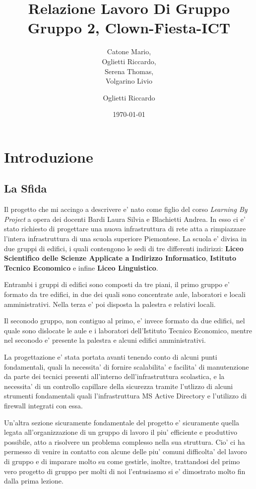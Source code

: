 \documentclass{report}
\author{Catone Mario,\\
	Oglietti Riccardo,\\
	Serena Thomas,\\
Volgarino Livio}
\title{Relazione Lavoro Di Gruppo\\
\large Gruppo 2, Clown-Fiesta-ICT}
\date{\today}
\begin{document}
	\maketitle
	\tableofcontents
	\chapter{Introduzione}
	\author{Oglietti Riccardo}
		\section{La Sfida}
			Il progetto che mi accingo a descrivere e' nato come figlio del corso \emph{Learning By Project} a opera dei docenti 
			Bardi Laura Silvia e Blachietti Andrea. In esso ci e' stato richiesto di progettare una nuova infrastruttura di 
			rete atta a rimpiazzare l'intera infrastruttura di una scuola superiore Piemontese. La scuola e' divisa in due 
			gruppi di edifici, i quali contengono le sedi di tre differenti indirizzi: \textbf{Liceo Scientifico delle Scienze 
			Applicate a Indirizzo Informatico}, \textbf{Istituto Tecnico Economico} e infine \textbf{Liceo Linguistico}.

			Entrambi i gruppi di edifici sono composti da tre piani, il primo gruppo e' formato da tre edifici, in due 
			dei quali sono concentrate aule, laboratori e locali amministrativi. Nella terza e' poi disposta la palestra
			e relativi locali.

			Il seconodo gruppo, non contiguo al primo, e' invece formato da due edifici, nel quale sono dislocate le aule e 
			i laboratori dell'Istituto Tecnico Economico, mentre nel seconodo e' presente la palestra e alcuni edifici
			amministrativi.

			La progettazione e' stata portata avanti tenendo conto di alcuni punti fondamentali, quali la necessita' di 
			fornire scalabilita' e facilita' di manutenzione da parte dei tecnici presenti all'interno dell'infrastruttura 
			scolastica, e la necessita' di un controllo capillare della sicurezza tramite l'utlizzo di alcuni strumenti 
			fondamentali quali l'infrastruttura MS Active Directory e l'utilizzo di firewall integrati con essa. 

			Un'altra sezione sicuramente fondamentale del progetto e' sicuramente quella legata all'organizzazione di un 
			gruppo di lavoro il piu' efficiente e produttivo possibile, atto a risolvere un problema complesso nella sua 
			struttura. Cio' ci ha permesso di venire in contatto con alcune delle piu' comuni difficolta' del lavoro di
			gruppo
			e di imparare molto su come gestirle, inoltre, trattandosi del primo vero progetto di gruppo per molti di noi 
			l'entusiasmo si e' dimostrato molto fin dalla prima lezione.
\end{document}
